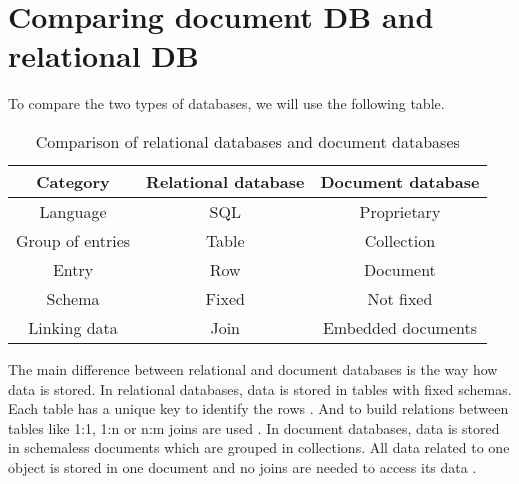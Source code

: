 
\section{Comparing document DB and relational DB}

To compare the two types of databases, we will use the following table.

\begin{table}[H]
    \centering
    \begin{adjustbox}{width=1\textwidth}
        \begin{tabular}{c|c|c}
            \textbf{Category} & \textbf{Relational database}    & \textbf{Document database} \\ \hline \hline
            Language          & SQL                             & Proprietary                \\ 
            Group of entries  & Table                           & Collection                 \\ 
            Entry             & Row                             & Document                   \\ 
            Schema            & Fixed                           & Not fixed                  \\ 
            Linking data      & Join                            & Embedded documents         \\ 
        \end{tabular}
    \end{adjustbox}
    \caption{Comparison of relational databases and document databases \parencites[p. 91]{chauhan2019review}{Relational-vs-Document}}
    \label{tab:document-relational-comparison}
\end{table}
\color{black}

The main difference between relational and document databases is the way how data is stored. 
In relational databases, data is stored in tables with fixed schemas. Each table has a unique key to identify the rows \parencites[p. 91]{chauhan2019review}{Relational-vs-Document}. 
And to build relations between tables like 1:1, 1:n or n:m joins are used \parencite[pp. 25-31]{Studer2019}.
In document databases, data is stored in schemaless documents which are grouped in collections.
All data related to one object is stored in one document and no joins are needed to access its data \parencite[pp. 18-20]{Meier2016}.
